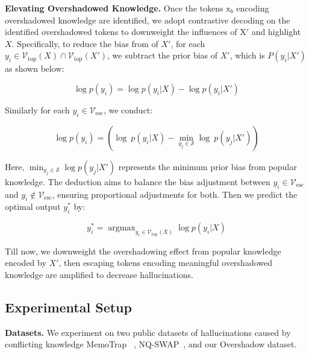 \noindent \textbf{Elevating Overshadowed Knowledge.}
Once the tokens $\text{x}_b$ encoding overshadowed knowledge are identified, we adopt contrastive decoding on the identified overshadowed tokens to downweight the influences of $\text{X}'$ and highlight $X$.
Specifically, to reduce the bias from of $X'$, for each $y_i \in \mathcal{V}_{\text{top}}(X) \cap \mathcal{V}_{\text{top}}(X')$, we subtract the prior bias of $X'$, which is $P(y_i|X')$ as shown below:

\begin{small}
\begin{equation}
  \log {p}(y_i) = \log p(y_i|X) - \log p(y_i|X')
\end{equation}
\end{small}



\noindent Similarly for each $y_i \in \mathcal{V}_{\text{esc}}$, we conduct:

\vspace{-0.5em}
\begin{small}
  \begin{equation}
    \log {p}(y_i) = (\log~p(y_i|X)-\min_{y_j\in\mathcal{S}}\log~p(y_j|X'))
\end{equation}  
\end{small}

\noindent Here, $\min_{y_j \in \mathcal{S}} \log p(y_j|X')$ represents the minimum prior bias from popular knowledge. The deduction aims to balance the bias adjustment between $y_i \in \mathcal{V}_{\text{esc}}$ and $y_i \notin \mathcal{V}_{\text{esc}}$, ensuring proportional adjustments for both.
Then we predict the optimal output $y_i^*$ by:

\begin{small}
    \begin{equation}
    y_i^* = \mathop{\mathrm{argmax}}_{y_i \in\mathcal{V}_{\text{top}}(X)} \log p (y_i|X)
\end{equation}
\end{small}




\noindent Till now, we downweight the overshadowing effect from popular knowledge encoded by $X'$, then escaping tokens encoding meaningful overshadowed knowledge are amplified to decrease hallucinations. 


\subsection{Experimental Setup}
\noindent \textbf{Datasets.}
We experiment on two public datasets of hallucinations caused by conflicting knowledge MemoTrap~\cite{liu2023memotrap}
,  NQ-SWAP~\cite{longpre-etal-2021-entity}, and our Overshadow dataset.


